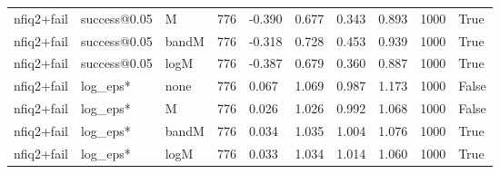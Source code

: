 \begin{tabular}{llllllllll}
nfiq2+fail & success@0.05 & M & 776 & -0.390 & 0.677 & 0.343 & 0.893 & 1000 & True \\
nfiq2+fail & success@0.05 & bandM & 776 & -0.318 & 0.728 & 0.453 & 0.939 & 1000 & True \\
nfiq2+fail & success@0.05 & logM & 776 & -0.387 & 0.679 & 0.360 & 0.887 & 1000 & True \\
nfiq2+fail & log\_eps* & none & 776 & 0.067 & 1.069 & 0.987 & 1.173 & 1000 & False \\
nfiq2+fail & log\_eps* & M & 776 & 0.026 & 1.026 & 0.992 & 1.068 & 1000 & False \\
nfiq2+fail & log\_eps* & bandM & 776 & 0.034 & 1.035 & 1.004 & 1.076 & 1000 & True \\
nfiq2+fail & log\_eps* & logM & 776 & 0.033 & 1.034 & 1.014 & 1.060 & 1000 & True \\
\hline
\end{tabular}
